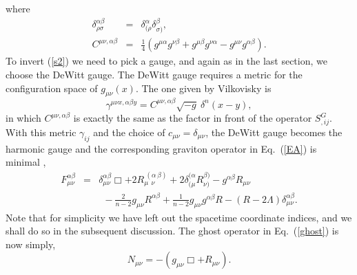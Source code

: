 \documentclass[a4paper,aps,preprint,groupedaddress,showpacs]{revtex4}
\begin{document}
where 
\begin{eqnarray}
\delta^{\alpha\beta}_{\rho\sigma}
&=&\delta^{\alpha}_{(\rho}\delta^{\beta}_{\sigma)},
\\
C^{\mu\nu,\alpha\beta}
&=&\frac{1}{4}(g^{\mu\alpha}g^{\nu\beta}+
g^{\mu\beta}g^{\nu\alpha}-g^{\mu\nu}g^{\alpha\beta}).
\end{eqnarray}
To invert (\ref{s2}) we need to pick a gauge, and again as in the last section,
 we choose the DeWitt gauge. The DeWitt gauge requires a metric
for the configuration space of $g_{\mu\nu}(x)$. The one given
by Vilkovisky is \cite{GV}
\begin{equation}
\gamma^{\mu\nu x,\alpha\beta y}=C^{\mu\nu,\alpha\beta}
\sqrt{-g}\ \delta^{n}(x-y),
\end{equation}
in which $C^{\mu\nu,\alpha\beta}$ is exactly the same as the 
factor in front
of the operator $S^{G}_{,ij}$. With this metric $\gamma_{ij}$ and
the choice of $c_{\mu\nu}=\delta_{\mu\nu}$, the DeWitt gauge 
becomes the harmonic gauge and the corresponding graviton operator
in Eq.~(\ref{EA}) is minimal \cite{CK2},
\begin{eqnarray}
F^{\alpha\beta}_{\mu\nu}
&=&\delta^{\alpha\beta}_{\mu\nu}\Box+
2R^{\ (\alpha\ \beta)}_{\mu\ \ \nu}+
2\delta^{(\alpha}_{(\mu}R^{\beta)}_{\nu)}-
g^{\alpha\beta}R_{\mu\nu}
\nonumber\\
&&\ \ -\frac{2}{n-2}g_{\mu\nu}R^{\alpha\beta}+
\frac{1}{n-2}g_{\mu\nu}g^{\alpha\beta}R-
(R-2\Lambda)\delta^{\alpha\beta}_{\mu\nu}.
\end{eqnarray}
Note that
for simplicity we have left out the spacetime coordinate indices,
and we shall do so in the subsequent discussion.
The ghost operator in Eq.~(\ref{ghost}) is now simply,
\begin{equation}
N_{\mu\nu}=-(g_{\mu\nu}\Box+R_{\mu\nu}).
\end{equation}
\end{document}
